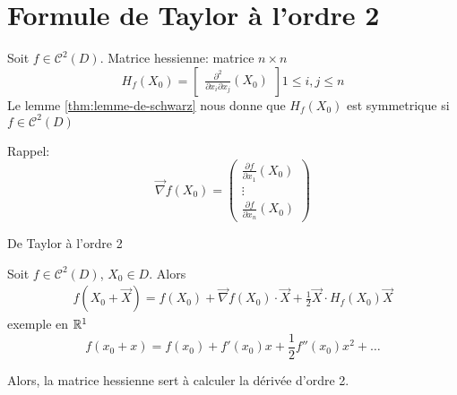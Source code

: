\section{Formule de Taylor à l'ordre 2}
\begin{definition}
    Soit $f \in \mathcal{C}^2(D)$. Matrice hessienne: matrice  $n \times n$
    \[
    H_f(X_0) = \begin{bmatrix} \frac{\partial^2}{\partial x_i \partial x_j}(X_0) \end{bmatrix} 1\le i,j \le n
    \] 
    Le lemme \ref{thm:lemme-de-schwarz} nous donne que $H_f(X_0)$ est symmetrique si $f \in \mathcal{C}^2(D)$
\end{definition}
Rappel: 
\[
    \vec{\nabla}f(X_0) = \begin{pmatrix} \frac{\partial f}{\partial x_1}(X_0) \\ \vdots \\ \frac{\partial f}{\partial x_n}(X_0) \end{pmatrix} 
\] 

\begin{theorem} De Taylor à l'ordre 2 \par
    Soit $f \in \mathcal{C}^2(D)$,  $X_0 \in D$. Alors  
    \begin{align*}
        f(X_0 + \vec{X}) = f(X_0) + \vec{\nabla }f(X_0) \cdot \vec{X} + \frac{1}{2}\vec{X} \cdot H_f(X_0)\vec{X}
    \end{align*}
    exemple en $\mathbb{R}^1$
    \[
    f(x_0 + x) = f(x_0) + f'(x_0)x + \frac{1}{2}f''(x_0)x^2 + \ldots
    \] 
\end{theorem}
\begin{intuition}
   Alors, la matrice hessienne sert à calculer la dérivée d'ordre 2. 
\end{intuition}

